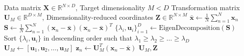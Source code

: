 \documentclass[11pt,a4paper]{article}
\begin{document}
\begin{algorithm}[H]
\caption{Principal Component Analysis (Maximum Variance Formulation)}
\label{alg:pca}
\begin{algorithmic}[1]
\Require Data matrix $\mathbf{X} \in \mathbb{R}^{N \times D}$, Target dimensionality $M < D$
\Ensure Transformation matrix $\mathbf{U}_M \in \mathbb{R}^{D \times M}$, Dimensionality-reduced coordinates $\mathbf{Z} \in \mathbb{R}^{N \times M}$
    \State $\mathbf{\bar{x}} \gets \frac{1}{N}\sum_{n=1}^{N} \mathbf{x}_n$ 
    \State $\mathbf{S} \gets \frac{1}{N}\sum_{n=1}^{N} (\mathbf{x}_n - \mathbf{\bar{x}})(\mathbf{x}_n - \mathbf{\bar{x}})^T$ 
    \State $\{\lambda_i, \mathbf{u}_i\}_{i=1}^D \gets \text{EigenDecomposition}(\mathbf{S})$ 
    \State Sort $\{\lambda_i, \mathbf{u}_i\}$ in descending order such that $\lambda_1 \ge \lambda_2 \ge \dots \ge \lambda_D$
    \State $\mathbf{U}_M \gets [\mathbf{u}_1, \mathbf{u}_2, \dots, \mathbf{u}_M]$ 
        \State $\mathbf{z}_n \gets \mathbf{U}_M^T (\mathbf{x}_n - \mathbf{\bar{x}})$ 
    \EndFor
    \State \Return $\mathbf{U}_M, \mathbf{Z}$
\EndProcedure
\end{algorithmic}
\end{algorithm}
\end{document}
